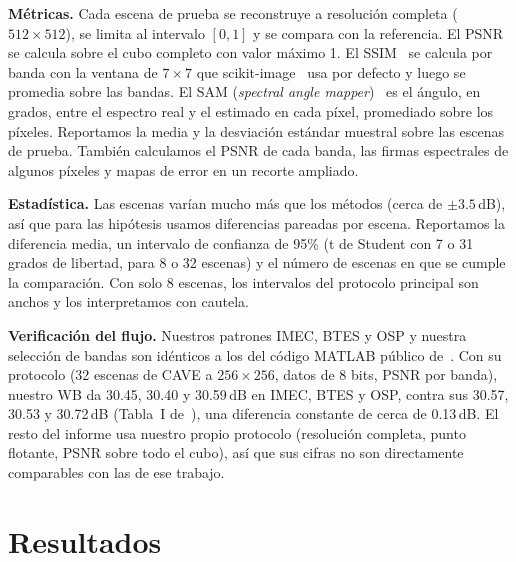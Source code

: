 \documentclass{article}
\begin{document}
\textbf{Métricas.} Cada escena de prueba se reconstruye a resolución
completa ($512\times512$), se limita al intervalo $[0,1]$ y se compara con
la referencia. El PSNR se calcula sobre el cubo completo con valor máximo 1.
El SSIM~\cite{wang2004} se calcula por banda con la ventana de $7\times7$
que scikit-image~\cite{vanderwalt2014} usa por defecto y luego se promedia
sobre las bandas. El SAM (\emph{spectral angle mapper})~\cite{kruse1993} es
el ángulo, en grados, entre el espectro real y el estimado en cada píxel,
promediado sobre los píxeles. Reportamos la media y la desviación estándar
muestral sobre las escenas de prueba. También calculamos el PSNR de cada
banda, las firmas espectrales de algunos píxeles y mapas de error en un
recorte ampliado.

\textbf{Estadística.} Las escenas varían mucho más que los métodos (cerca de
$\pm3.5$\,dB), así que para las hipótesis usamos diferencias pareadas por
escena. Reportamos la diferencia media, un intervalo de confianza de 95\% (t
de Student con 7 o 31 grados de libertad, para 8 o 32 escenas) y el número
de escenas en que se cumple la comparación. Con solo 8 escenas, los
intervalos del protocolo principal son anchos y los interpretamos con
cautela.

\textbf{Verificación del flujo.} Nuestros patrones IMEC, BTES y OSP y
nuestra selección de bandas son idénticos a los del código MATLAB público
de~\cite{diaz2023}. Con su protocolo (32 escenas de CAVE a $256\times256$,
datos de 8 bits, PSNR por banda), nuestro WB da 30.45, 30.40 y 30.59\,dB en
IMEC, BTES y OSP, contra sus 30.57, 30.53 y 30.72\,dB (Tabla~I
de~\cite{diaz2023}), una diferencia constante de cerca de 0.13\,dB. El resto
del informe usa nuestro propio protocolo (resolución completa, punto
flotante, PSNR sobre todo el cubo), así que sus cifras no son directamente
comparables con las de ese trabajo.

\section{Resultados}
\label{sec:results}
\end{document}
